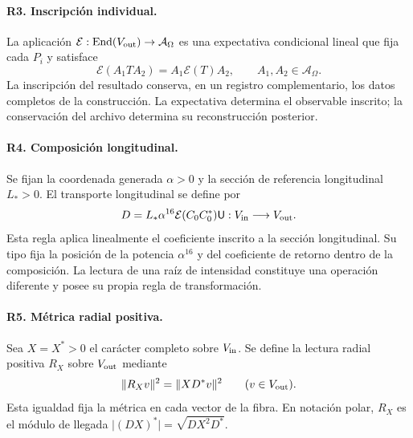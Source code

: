 \paragraph{R3. Inscripción individual.}
La aplicación
\(\mathcal E:\operatorname{End}(V_{\rm out})\to\mathcal A_\Omega\)
es una expectativa condicional lineal que fija cada \(P_i\) y satisface
\begin{equation}
 \mathcal E(A_1TA_2)=A_1\mathcal E(T)A_2,
 \qquad A_1,A_2\in\mathcal A_\Omega.
 \label{g26:eq:bimodularidad-es}
\end{equation}
La inscripción del resultado conserva, en un registro complementario,
los datos completos de la construcción. La expectativa determina el
observable inscrito; la conservación del archivo determina su
reconstrucción posterior.

\paragraph{R4. Composición longitudinal.}
Se fijan la coordenada generada \(\alpha>0\) y la sección de referencia
longitudinal \(L_*>0\). El transporte longitudinal se define por
\begin{equation}
 D=L_*\alpha^{16}\mathcal E(C_0C_0^*)\mathsf U:
 V_{\rm in}\longrightarrow V_{\rm out}.
 \label{g26:eq:regla-longitudinal-es}
\end{equation}
Esta regla aplica linealmente el coeficiente inscrito a la sección
longitudinal. Su tipo fija la posición de la potencia \(\alpha^{16}\)
y del coeficiente de retorno dentro de la composición. La lectura de
una raíz de intensidad constituye una operación diferente y posee su
propia regla de transformación.

\paragraph{R5. Métrica radial positiva.}
Sea \(X=X^*>0\) el carácter completo sobre \(V_{\rm in}\). Se define
la lectura radial positiva \(R_X\) sobre \(V_{\rm out}\) mediante
\begin{equation}
 \|R_Xv\|^2=\|XD^*v\|^2
 \qquad(v\in V_{\rm out}).
 \label{g26:eq:metrica-radial-es}
\end{equation}
Esta igualdad fija la métrica en cada vector de la fibra. En notación
polar, \(R_X\) es el módulo de llegada
\(\lvert(DX)^*\rvert=\sqrt{DX^2D^*}\).

